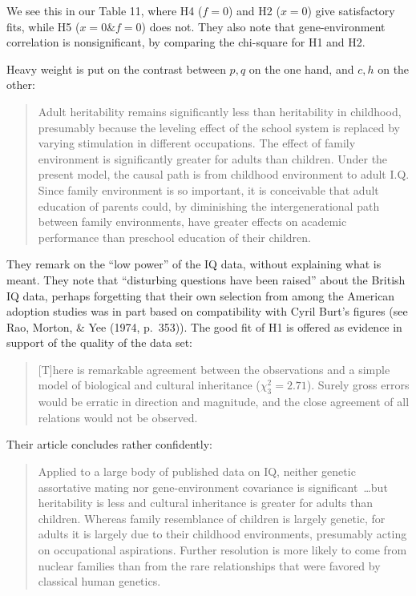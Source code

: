 ﻿\documentclass[12pt]{article}
\begin{document}
We see this in our Table 11, where H4 ($f=0$) and H2 ($x=0$) give satisfactory fits, while H5 ($x=0 \& f=0$) does not. They also note that gene-environment correlation is nonsignificant, by comparing the chi-square for H1 and H2.

Heavy weight is put on the contrast between $p,q$ on the one hand, and $c,h$ on the other:

\begin{quote}
Adult heritability remains significantly less than heritability in childhood, presumably because the leveling effect of the school system is replaced by varying stimulation in different occupations. The effect of family environment is significantly greater for adults than children. Under the present model, the causal path is from childhood environment to adult I.Q. Since family environment is so important, it is conceivable that adult education of parents could, by diminishing the intergenerational path between family environments, have greater effects on academic performance than preschool education of their children.
\end{quote}

They remark on the ``low power'' of the IQ data, without explaining what is meant. They note that ``disturbing questions have been raised'' about the British IQ data, perhaps forgetting that their own selection from among the American adoption studies was in part based on compatibility with Cyril Burt's figures (see Rao, Morton, \& Yee (1974, p.\ 353)). The good fit of H1 is offered as evidence in support of the quality of the data set:

\begin{quote}
[T]here is remarkable agreement between the observations and a simple model of biological and cultural inheritance ($\chi_3^2=2.71$). Surely gross errors would be erratic in direction and magnitude, and the close agreement of all relations would not be observed.
\end{quote}

Their article concludes rather confidently:

\begin{quote}
Applied to a large body of published data on IQ, neither genetic assortative mating nor gene-environment covariance is significant~\ldots but heritability is less and cultural inheritance is greater for adults than children. Whereas family resemblance of children is largely genetic, for adults it is largely due to their childhood environments, presumably acting on occupational aspirations. Further resolution is more likely to come from nuclear families than from the rare relationships that were favored by classical human genetics.
\end{quote}
\end{document}
